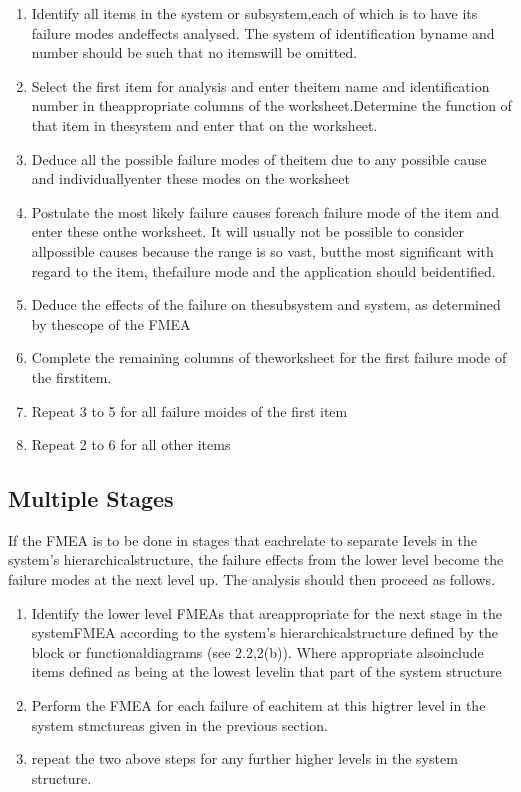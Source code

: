 \documentclass[./dissertation.tex]{subfiles}
\begin{document}
\begin{enumerate}

	\item Identify all items in the system or subsystem,each of which is to have its failure modes andeffects analysed. The system of identification byname and number should be such that no itemswill be omitted.
	\item Select the first item for analysis and enter theitem name and identification number in theappropriate columns of the worksheet.Determine the function of that item in thesystem and enter that on the worksheet.
	\item Deduce all the possible failure modes of theitem due to any possible cause and individuallyenter these modes on the worksheet
	\item  Postulate the most likely failure causes foreach failure mode of the item and enter these onthe worksheet. It will usually not be possible to consider allpossible causes because the range is so vast, butthe most significant with regard to the item, thefailure mode and the application should beidentified.
	\item Deduce the effects of the failure on thesubsystem and system, as determined by thescope of the FMEA
	\item  Complete the remaining columns of theworksheet for the first failure mode of the firstitem.
	\item Repeat 3 to 5 for all failure moides of the first item
	\item Repeat 2 to 6 for all other items
\end{enumerate}


\subsection{Multiple Stages}
If the FMEA is to be done in stages that eachrelate to separate Ievels in the system's hierarchicalstructure, the failure effects from the lower level become the failure modes at the next level up. The analysis should then proceed as follows.

\begin{enumerate}
	\item Identify the lower level FMEAs that areappropriate for the next stage in the systemFMEA according to the system's hierarchicalstructure defined by the block or functionaldiagrams (see 2.2,2(b)). Where appropriate alsoinclude items defined as being at the lowest levelin that part of the system structure
	\item Perform the FMEA for each failure of eachitem at this higtrer level in the system stmctureas given in the previous section.
	\item repeat the two above steps for any further higher levels in the system structure.
\end{enumerate}
\end{document}
